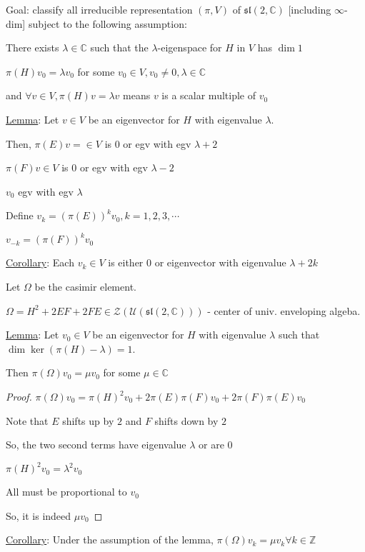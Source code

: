 \documentclass{article}
\theoremstyle{definition}
\begin{document}
Goal: classify all irreducible representation \((\pi, V)\) of \(\mathfrak{sl}(2,\mathbb{C})\) [including \(\infty\)-dim] subject to the following assumption:

There exists \(\lambda \in \mathbb{C}\) such that the \(\lambda\)-eigenspace for \(H\) in \(V\) has \(\dim 1\)

\(\pi(H)v_0 = \lambda v_0\) for some \(v_0 \in V, v_0 \neq 0, \lambda \in \mathbb{C}\)

and \(\forall v\in V, \pi(H)v = \lambda v\) means \(v\) is a scalar multiple of \(v_0\) 

\underline{Lemma}: Let \(v\in V\) be an eigenvector for \(H\) with eigenvalue \(\lambda\).

Then, \(\pi(E)v = \in V\) is \(0\) or egv with egv \(\lambda + 2\)

\(\pi(F)v\in V\) is \(0\) or egv with egv \(\lambda - 2\)

\(v_0\) egv with egv \(\lambda\)

Define \(v_k = (\pi(E))^k v_0, k = 1,2,3,\cdots\)

\(v_{-k}=(\pi(F))^k v_0\)

\underline{Corollary}: Each \(v_k\in V\) is either \(0\) or eigenvector with eigenvalue \(\lambda + 2k\) 

Let \(\Omega\) be the casimir element.

\(\Omega = H^2 + 2EF + 2FE \in \mathcal{Z}(\mathcal{U}(\mathfrak{sl}(2,\mathbb{C})))\) - center of univ. enveloping algeba.

\underline{Lemma}: Let \(v_0\in V\) be an eigenvector for \(H\) with eigenvalue \(\lambda\) such that \(\dim \ker (\pi(H)-\lambda)=1\).

Then \(\pi(\Omega)v_0 = \mu v_0\) for some \(\mu \in \mathbb{C}\)  

\begin{proof}
    \(\pi(\Omega)v_0 = \pi(H)^2 v_0 + 2\pi(E)\pi(F)v_0 + 2\pi(F)\pi(E)v_0\) 

    Note that \(E\) shifts up by \(2\) and \(F\) shifts down by \(2\)

    So, the two second terms have eigenvalue \(\lambda\) or are \(0\) 
    
    \(\pi(H)^2 v_0 = \lambda^2 v_0\)

    All must be proportional to \(v_0\) 

    So, it is indeed \(\mu v_0\) 
    
\end{proof}

\underline{Corollary}: Under the assumption of the lemma, \(\pi(\Omega)v_k = \mu v_k \forall k\in \mathbb{Z}\) 
\end{document}

